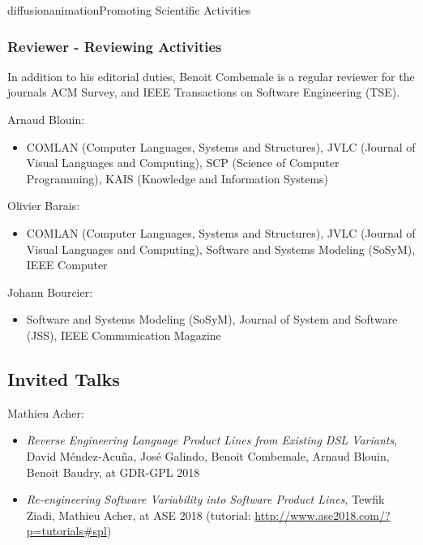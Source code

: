 \documentclass{ra2018}
\begin{document}
\begin{module}{diffusion}{animation}{Promoting Scientific Activities}
    \subsubsection{Reviewer - Reviewing Activities}
    
In addition to his editorial duties, Benoit Combemale is a regular reviewer for the journals ACM Survey, and IEEE Transactions on Software Engineering (TSE).


Arnaud Blouin:
\begin{itemize}
    \item COMLAN (Computer Languages, Systems and Structures), JVLC (Journal of Visual Languages and Computing), SCP (Science of Computer Programming), KAIS (Knowledge and Information Systems)
\end{itemize} 

Olivier Barais:
\begin{itemize}
	\item COMLAN (Computer Languages, Systems and Structures), JVLC (Journal of Visual Languages and Computing),  Software and Systems Modeling (SoSyM), IEEE Computer
\end{itemize} 

Johann Bourcier:
\begin{itemize}
	\item Software and Systems Modeling (SoSyM), Journal of System and Software (JSS), IEEE Communication Magazine
\end{itemize} 

 
 
     
     
    
    
\subsection{Invited Talks}
Mathieu Acher:
\begin{itemize}
	\item \emph{Reverse Engineering Language Product Lines from Existing DSL Variants}, David Méndez-Acuña, José Galindo, Benoit Combemale, Arnaud Blouin, Benoit Baudry, at GDR-GPL 2018

	\item \emph{Re-engineering Software Variability into Software Product Lines}, Tewfik Ziadi, Mathieu Acher, at ASE 2018 (tutorial: \url{http://www.ase2018.com/?p=tutorials#spl})
\end{itemize}


\end{module}
\end{document}
